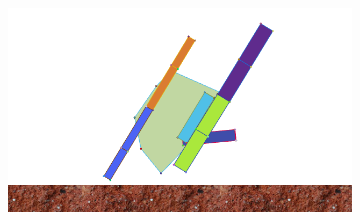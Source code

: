 \begin{figure}[H]
\begin{subfigure}[b]{0.3\textwidth}
        \end{subfigure}
        \hspace{\fill}
        \begin{subfigure}[b]{0.3\textwidth}
          \includegraphics[width=\linewidth,center]{graphics/simulation-discussion/hupf_3}
          \caption{\label{fig:hupf_3}}
        \end{subfigure}


\end{figure}
